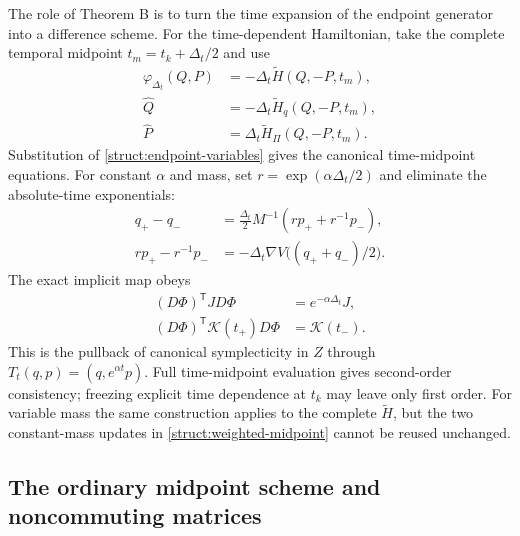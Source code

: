 The role of Theorem B is to turn the time expansion of the endpoint generator into a difference scheme. For the time-dependent Hamiltonian, take the complete temporal midpoint $t_m=t_k+\Delta_t/2$ and use
\begin{equation}\label{struct:lifted-generator}
\begin{aligned}
 \varphi_{\Delta_t}(Q,P)&=-\Delta_t\widetilde H(Q,-P,t_m),\\
 \widehat Q&=-\Delta_t\widetilde H_q(Q,-P,t_m),\\
 \widehat P&=\Delta_t\widetilde H_\Pi(Q,-P,t_m).
\end{aligned}
\end{equation}
Substitution of \eqref{struct:endpoint-variables} gives the canonical time-midpoint equations. For constant $\alpha$ and mass, set $r=\exp(\alpha\Delta_t/2)$ and eliminate the absolute-time exponentials:
\begin{equation}\label{struct:weighted-midpoint}
\begin{aligned}
 q_+-q_-&=\tfrac{\Delta_t}{2}M^{-1}(r p_++r^{-1}p_-),\\
 r p_+-r^{-1}p_-&=-\Delta_t\nabla V\bigl((q_++q_-)/2\bigr).
\end{aligned}
\end{equation}
The exact implicit map obeys
\begin{equation}\label{struct:weighted-structure}
\begin{aligned}
 (D\Phi)^{\mathsf T}J D\Phi&=e^{-\alpha\Delta_t}J,\\
 (D\Phi)^{\mathsf T}\mathcal K(t_+)D\Phi&=\mathcal K(t_-).
\end{aligned}
\end{equation}
This is the pullback of canonical symplecticity in $Z$ through $T_t(q,p)=(q,e^{\alpha t}p)$. Full time-midpoint evaluation gives second-order consistency; freezing explicit time dependence at $t_k$ may leave only first order. For variable mass the same construction applies to the complete $\widetilde H$, but the two constant-mass updates in \eqref{struct:weighted-midpoint} cannot be reused unchanged.

\subsection{The ordinary midpoint scheme and noncommuting matrices}
\label{struct:matrix-section}

